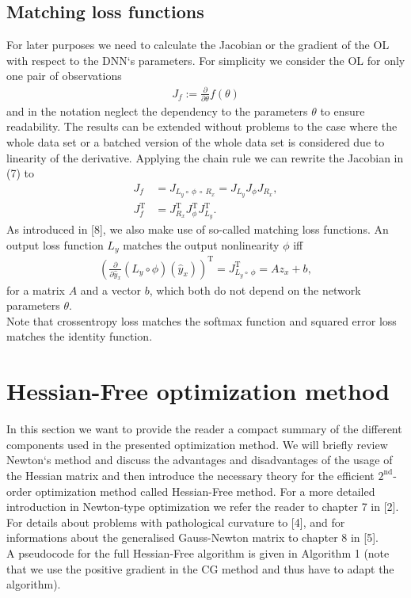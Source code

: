 \documentclass[conference]{IEEEtran}
\begin{document}
\subsection{Matching loss functions}
\noindent
For later purposes we need to calculate the Jacobian or the gradient of the OL with respect to the DNN`s parameters. For simplicity we consider the OL for only one pair of observations
\begin{align}
J_{f} := \frac{\partial}{\partial\theta}f(\theta)
\end{align}
and in the notation neglect the dependency to the parameters $\theta$ to ensure readability.
The results can be extended without problems to the case where the whole data set or a batched version of the whole data set is considered due to linearity of the derivative.
Applying the chain rule we can rewrite the Jacobian in (7) to
\begin{align}
J_{f} &= J_{L_{y}\circ \:\phi \:\circ\:R_{x}} = J_{L_{y}} J_{\phi} J_{R_{x}},\\
J_{f}^{\mathrm{T}} &= J_{R_{x}}^{\mathrm{T}}  J_{\phi}^{\mathrm{T}}  J_{L_{y}}^{\mathrm{T}}.
\end{align}
As introduced in [8], we also make use of so-called matching loss functions. An output loss function $L_{y}$ matches the output nonlinearity $\phi$ iff
\begin{align}
\left(\frac{\partial}{\partial\hat{y}_{x}}\left(L_{y}\circ \phi\right)(\hat{y}_{x})\right)^{\mathrm{T}}= J_{L_{y}\circ \:\phi}^{\mathrm{T}} = A z_{x} + b,
\end{align}
for a matrix $A$ and a vector $b$, which both do not depend on the network parameters $\theta$.\\
Note that crossentropy loss matches the softmax function and squared error loss matches the identity function.


\section{Hessian-Free optimization method}
\noindent
In this section we want to provide the reader a compact summary of the different components used in the presented optimization method. We will briefly review Newton`s method and discuss the advantages and disadvantages of the usage of the Hessian matrix and then introduce the necessary theory for the efficient $2^{\text{nd}}$-order optimization method called Hessian-Free method. For a more detailed introduction in Newton-type optimization we refer the reader to chapter 7 in [2]. For details about problems with pathological curvature to [4], and for informations about the generalised Gauss-Newton matrix to chapter 8 in [5].\\
A pseudocode for the full Hessian-Free algorithm is given in Algorithm 1 (note that we use the positive gradient in the CG method and thus have to adapt the algorithm).
\end{document}
